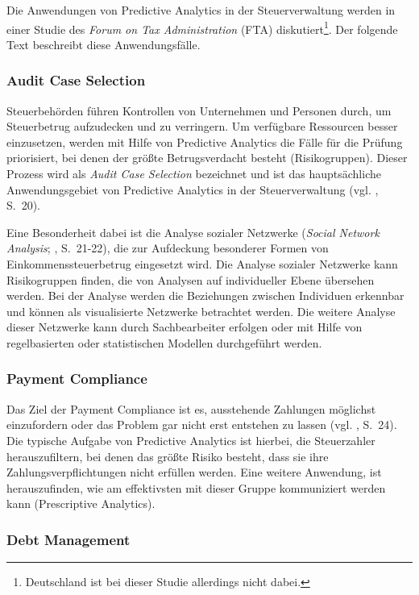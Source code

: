 Die Anwendungen von Predictive Analytics in der Steuerverwaltung werden in einer
Studie des \emph{Forum on Tax Administration} (FTA) diskutiert\footnote{
Deutschland ist bei dieser Studie allerdings nicht dabei.
}. Der folgende Text beschreibt diese Anwendungsfälle.

\subsubsection{Audit Case Selection}

Steuerbehörden führen Kontrollen von Unternehmen und Personen durch, um Steuerbetrug
aufzudecken und zu verringern. Um verfügbare Ressourcen besser einzusetzen, werden mit Hilfe
von Predictive Analytics die Fälle für die Prüfung priorisiert, bei denen der größte Betrugsverdacht
besteht (Risikogruppen). Dieser Prozess wird als \emph{Audit Case Selection} bezeichnet und ist das hauptsächliche
Anwendungsgebiet von Predictive Analytics in der Steuerverwaltung (vgl. \cite{OECD}, S.~20).

Eine Besonderheit dabei ist die Analyse sozialer Netzwerke (\emph{Social Network Analysis}; \cite{OECD}, S.~21-22),
die zur Aufdeckung besonderer Formen von Einkommenssteuerbetrug eingesetzt wird. Die Analyse sozialer Netzwerke kann
Risikogruppen finden, die von Analysen auf individueller Ebene übersehen werden. Bei der Analyse werden die Beziehungen
zwischen Individuen erkennbar und können als visualisierte Netzwerke betrachtet werden. Die weitere Analyse dieser Netzwerke
kann durch Sachbearbeiter erfolgen oder mit Hilfe von regelbasierten oder statistischen Modellen durchgeführt werden.

\subsubsection{Payment Compliance}

Das Ziel der Payment Compliance ist es, ausstehende Zahlungen möglichst einzufordern oder das Problem gar nicht erst
entstehen zu lassen (vgl. \cite{OECD}, S.~24). Die typische Aufgabe von Predictive Analytics ist hierbei, die
Steuerzahler herauszufiltern, bei denen das größte Risiko besteht, dass sie ihre Zahlungsverpflichtungen nicht erfüllen werden. 
Eine weitere Anwendung, ist herauszufinden, wie am effektivsten mit dieser Gruppe kommuniziert werden kann (Prescriptive Analytics).

\subsubsection{Debt Management}

